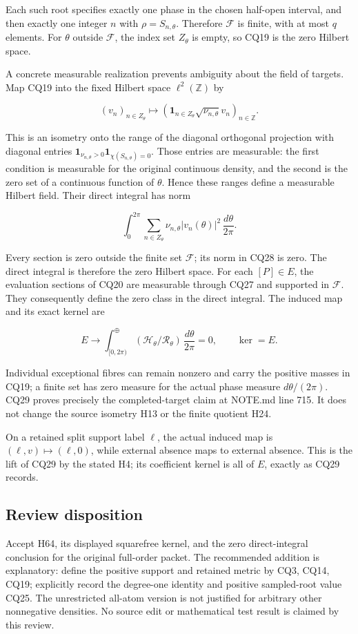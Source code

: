 Each such root specifies exactly one phase in the chosen half-open interval, and then exactly one integer \(n\) with \(\rho=S_{n,\theta}\). Therefore \(\mathcal F\) is finite, with at most \(q\) elements. For \(\theta\) outside \(\mathcal F\), the index set \(Z_\theta\) is empty, so CQ19 is the zero Hilbert space.

A concrete measurable realization prevents ambiguity about the field of targets. Map CQ19 into the fixed Hilbert space \(\ell^2(\mathbb Z)\) by

\[
(v_n)_{n\in Z_\theta}\longmapsto
\left(\mathbf1_{n\in Z_\theta}\sqrt{\nu_{n,\theta}}v_n\right)_{n\in\mathbb Z}.
\tag{CQ27}
\]

This is an isometry onto the range of the diagonal orthogonal projection with diagonal entries \(\mathbf1_{\nu_{n,\theta}>0} \mathbf1_{\chi(S_{n,\theta})=0}\). Those entries are measurable: the first condition is measurable for the original continuous density, and the second is the zero set of a continuous function of \(\theta\). Hence these ranges define a measurable Hilbert field. Their direct integral has norm

\[
\int_0^{2\pi}\sum_{n\in Z_\theta}
\nu_{n,\theta}|v_n(\theta)|^2\,\frac{d\theta}{2\pi}.
\tag{CQ28}
\]

Every section is zero outside the finite set \(\mathcal F\); its norm in CQ28 is zero. The direct integral is therefore the zero Hilbert space. For each \([P] \in E\), the evaluation sections of CQ20 are measurable through CQ27 and supported in \(\mathcal F\). They consequently define the zero class in the direct integral. The induced map and its exact kernel are

\[
E\longrightarrow
\int_{[0,2\pi)}^\oplus
(\mathcal H_\theta/\mathcal R_\theta)\,\frac{d\theta}{2\pi}
=0,
\qquad \ker=E.
\tag{CQ29}
\]

Individual exceptional fibres can remain nonzero and carry the positive masses in CQ19; a finite set has zero measure for the actual phase measure \(d\theta/(2 \pi)\). CQ29 proves precisely the completed-target claim at NOTE.md line 715. It does not change the source isometry H13 or the finite quotient H24.

On a retained split support label \(\ell\), the actual induced map is \((\ell,v) \longmapsto (\ell,0)\), while external absence maps to external absence. This is the lift of CQ29 by the stated H4; its coefficient kernel is all of \(E\), exactly as CQ29 records.

\subsection{Review disposition}\label{review-disposition}

Accept H64, its displayed squarefree kernel, and the zero direct-integral conclusion for the original full-order packet. The recommended addition is explanatory: define the positive support and retained metric by CQ3, CQ14, CQ19; explicitly record the degree-one identity and positive sampled-root value CQ25. The unrestricted all-atom version is not justified for arbitrary other nonnegative densities. No source edit or mathematical test result is claimed by this review.
